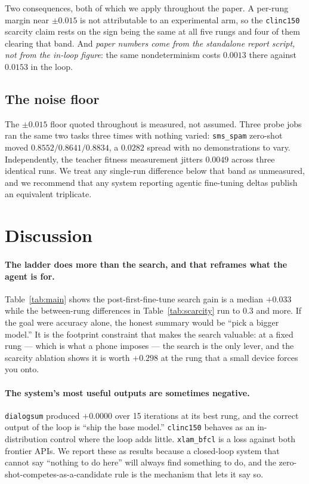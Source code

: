 \documentclass[sigconf,10pt]{acmart}
\newcommand{\tsk}[1]{\texttt{#1}}
\begin{document}
Two consequences, both of which we apply throughout the paper. A per-rung margin near
$\pm0.015$ is not attributable to an experimental arm, so the \tsk{clinc150} scarcity claim
rests on the sign being the same at all five rungs and four of them clearing that band. And
\emph{paper numbers come from the standalone report script, not from the in-loop figure}: the
same nondeterminism costs $0.0013$ there against $0.0153$ in the loop.

\subsection{The noise floor}

The $\pm0.015$ floor quoted throughout is measured, not assumed. Three probe jobs ran the same
two tasks three times with nothing varied: \tsk{sms\_spam} zero-shot moved
$0.8552 / 0.8641 / 0.8834$, a $0.0282$ spread with no demonstrations to vary. Independently,
the teacher fitness measurement jitters $0.0049$ across three identical runs. We treat any
single-run difference below that band as unmeasured, and we recommend that any system
reporting agentic fine-tuning deltas publish an equivalent triplicate.

\section{Discussion}
\label{sec:discussion}

\paragraph{The ladder does more than the search, and that reframes what the agent is for.}
Table~\ref{tab:main} shows the post-first-fine-tune search gain is a median $+0.033$ while the
between-rung differences in Table~\ref{tab:scarcity} run to $0.3$ and more. If the goal were
accuracy alone, the honest summary would be ``pick a bigger model.'' It is the
footprint constraint that makes the search valuable: at a fixed rung --- which is what a phone
imposes --- the search is the only lever, and the scarcity ablation shows it is worth
$+0.298$ at the rung that a small device forces you onto.

\paragraph{The system's most useful outputs are sometimes negative.} \tsk{dialogsum} produced
$+0.0000$ over 15 iterations at its best rung, and the correct output of the loop is ``ship the
base model.'' \tsk{clinc150} behaves as an in-distribution control where the loop adds little.
\tsk{xlam\_bfcl} is a loss against both frontier APIs. We report these as results because a
closed-loop system that cannot say ``nothing to do here'' will always find something to do,
and the zero-shot-competes-as-a-candidate rule is the mechanism that lets it say so.
\end{document}
